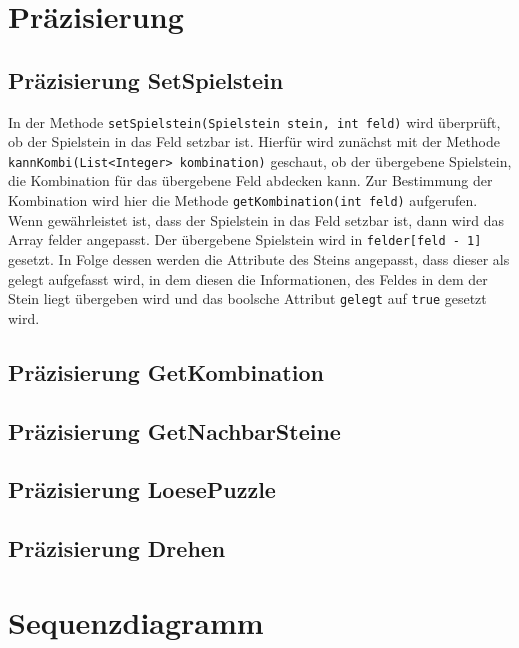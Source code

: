 \clearpage
\section{Präzisierung}
\subsection{Präzisierung SetSpielstein}
In der Methode \lstinline{setSpielstein(Spielstein stein, int feld)} wird überprüft, ob der Spielstein in das Feld setzbar ist. Hierfür wird zunächst mit der Methode \\  \lstinline{kannKombi(List<Integer> kombination)} geschaut, ob der übergebene Spielstein, die Kombination für das übergebene Feld abdecken kann. Zur Bestimmung der Kombination wird hier die Methode \lstinline{getKombination(int feld)} aufgerufen.
Wenn gewährleistet ist, dass der Spielstein in das Feld setzbar ist, dann wird das Array felder angepasst. Der übergebene Spielstein wird in \lstinline{felder[feld - 1]} gesetzt. In Folge dessen werden die Attribute des Steins angepasst, dass dieser als gelegt aufgefasst wird, in dem diesen die Informationen, des Feldes in dem der Stein liegt übergeben wird und das boolsche Attribut \lstinline{gelegt} auf \lstinline{true} gesetzt wird.
\clearpage

\subsection{Präzisierung GetKombination}
\subsection{Präzisierung GetNachbarSteine}
\subsection{Präzisierung LoesePuzzle}
\subsection{Präzisierung Drehen}
\clearpage

\section{Sequenzdiagramm}
\cleardoublepage